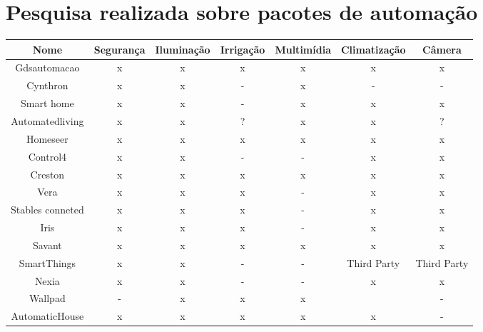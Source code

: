 \section{Pesquisa realizada sobre pacotes de automação}
\begin{tabular}{|c|c|c|c|c|c|c|}
\hline 
\textbf{Nome} & \textbf{Segurança} & \textbf{Iluminação} & \textbf{Irrigação} & \textbf{Multimídia} & \textbf{Climatização} & \textbf{Câmera}\tabularnewline
\hline 
\hline 
Gdsautomacao & x & x & x & x & x & x\tabularnewline
\hline 
Cynthron & x & x & - & x & - & -\tabularnewline
\hline 
Smart home & x & x & - & x & x & x\tabularnewline
\hline 
Automatedliving & x & x & ? & x & x & ?\tabularnewline
\hline 
Homeseer & x & x & x & x & x & x\tabularnewline
\hline 
Control4 & x & x & - & - & x & x\tabularnewline
\hline 
Creston & x & x & x & x & x & x\tabularnewline
\hline 
Vera & x & x & x & - & x & x\tabularnewline
\hline 
Stables conneted & x & x & x & - & x & x\tabularnewline
\hline 
Iris & x & x & x & - & x & x\tabularnewline
\hline 
Savant & x & x & x & x & x & x\tabularnewline
\hline 
SmartThings & x & x & - & - & Third Party & Third Party\tabularnewline
\hline 
Nexia & x & x & - & - & x & x\tabularnewline
\hline 
Wallpad & - & x & x & x & & -\tabularnewline
\hline 
AutomaticHouse & x & x & x & x & x & -\tabularnewline
\hline 
\end{tabular}







